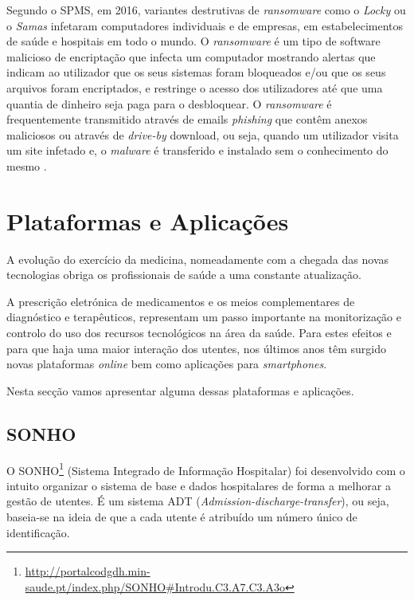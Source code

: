 \documentclass[conference]{IEEEtran}
\begin{document}
Segundo o SPMS, em 2016, variantes destrutivas de \textit{ransomware} como o \textit{Locky} ou o \textit{Samas} infetaram computadores individuais e de empresas, em estabelecimentos de saúde e hospitais em todo o mundo. O \textit{ransomware} é um tipo de software malicioso de encriptação que infecta um computador mostrando alertas que indicam ao utilizador que os seus sistemas foram bloqueados e/ou que os seus arquivos foram encriptados, e restringe o acesso dos utilizadores até que uma quantia de dinheiro seja paga para o desbloquear. 
O \textit{ransomware} é frequentemente transmitido através de emails \textit{phishing} que contêm anexos maliciosos ou através de \textit{drive-by} download, ou seja, quando um utilizador visita um site infetado e, o \textit{malware} é transferido e instalado sem o conhecimento do mesmo \cite{ameacas}. 



\section{Plataformas e Aplicações}	\label{plat_app}

A evolução do exercício da medicina, nomeadamente com a chegada das novas tecnologias obriga os profissionais de saúde a uma constante atualização.

A prescrição eletrónica de medicamentos e os meios complementares de diagnóstico e terapêuticos, representam um passo importante na monitorização e controlo do uso dos recursos tecnológicos na área da saúde. Para estes efeitos e para que haja uma maior interação dos utentes, nos últimos anos têm surgido novas plataformas \textit{online} bem como aplicações para \textit{smartphones}.

Nesta secção vamos apresentar alguma dessas plataformas e aplicações.


\subsection{SONHO}

O SONHO\footnote{\url{http://portalcodgdh.min-saude.pt/index.php/SONHO\#Introdu.C3.A7.C3.A3o}} (Sistema Integrado de Informação Hospitalar) foi desenvolvido com o intuito organizar o sistema de base e dados hospitalares de forma a melhorar a gestão de utentes. É um sistema ADT (\textit{Admission-discharge-transfer}), ou seja, baseia-se na ideia de que a cada utente é atribuído um número único de identificação.
\end{document}
